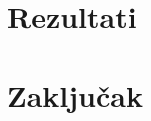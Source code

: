 \documentclass[a4paper]{article}
\begin{document}
\section{Rezultati}
\label{neuronskemreze}


\section{Zaključak}
\label{sec:zakljucak}

\appendix
 


\newpage
\appendix
\end{document}
